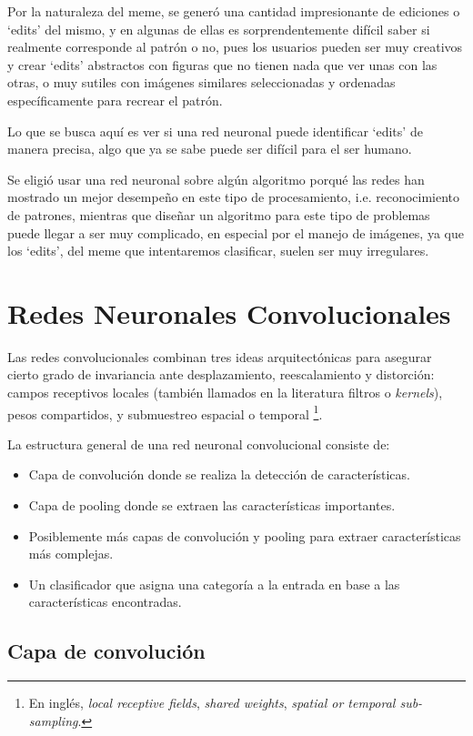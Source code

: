 \documentclass[spanish,11pt,letterpaper]{article}
\begin{document}
Por la naturaleza del meme, se generó una cantidad impresionante de ediciones o `edits' del mismo,
y en algunas de ellas es sorprendentemente difícil saber si realmente corresponde al patrón o no, pues
los usuarios pueden ser muy creativos y crear `edits' abstractos con figuras
que no tienen nada que ver unas con las otras, o muy sutiles con imágenes similares seleccionadas y
ordenadas específicamente para recrear el patrón.

Lo que se busca aquí es ver si una red neuronal puede identificar `edits' de manera precisa, algo que
ya se sabe puede ser difícil para el ser humano.

Se eligió usar una red neuronal sobre algún algoritmo porqué las redes han mostrado un mejor desempeño en este tipo de procesamiento, i.e.
reconocimiento de patrones, mientras que diseñar un algoritmo para este tipo de problemas puede llegar a ser muy complicado, en especial por el
manejo de imágenes, ya que los `edits', del meme que intentaremos clasificar, suelen ser muy irregulares.

\section{Redes Neuronales Convolucionales\cite{lecun}}

Las redes convolucionales combinan tres ideas arquitectónicas para asegurar cierto
grado de invariancia ante desplazamiento, reescalamiento y distorción: campos
receptivos locales (también llamados en la literatura filtros o \textit{kernels}),
pesos compartidos, y submuestreo espacial o temporal%
\footnote{En inglés, \textit{local receptive fields}, \textit{shared weights},
\textit{spatial or temporal sub-sampling}.}.

La estructura general de una red neuronal convolucional consiste de:
\begin{itemize}
  \item Capa de convolución donde se realiza la detección de características.
  \item Capa de pooling donde se extraen las características importantes.
  \item Posiblemente más capas de convolución y pooling para extraer características
  más complejas.
  \item Un clasificador que asigna una categoría a la entrada en base a las
  características encontradas.
\end{itemize}

\subsection{Capa de convolución}
\end{document}
